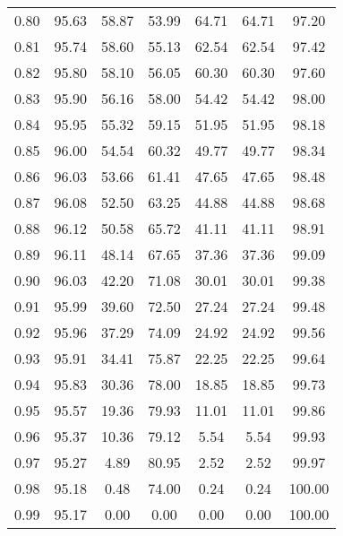 \begin{tabular}{|c|c|c|c|c|c|c|}
      0.80 &     95.63 &     58.87 &      53.99 &   64.71 &      64.71 &         97.20 \\
      0.81 &     95.74 &     58.60 &      55.13 &   62.54 &      62.54 &         97.42 \\
      0.82 &     95.80 &     58.10 &      56.05 &   60.30 &      60.30 &         97.60 \\
      0.83 &     95.90 &     56.16 &      58.00 &   54.42 &      54.42 &         98.00 \\
      0.84 &     95.95 &     55.32 &      59.15 &   51.95 &      51.95 &         98.18 \\
      0.85 &     96.00 &     54.54 &      60.32 &   49.77 &      49.77 &         98.34 \\
      0.86 &     96.03 &     53.66 &      61.41 &   47.65 &      47.65 &         98.48 \\
      0.87 &     96.08 &     52.50 &      63.25 &   44.88 &      44.88 &         98.68 \\
      0.88 &     96.12 &     50.58 &      65.72 &   41.11 &      41.11 &         98.91 \\
      0.89 &     96.11 &     48.14 &      67.65 &   37.36 &      37.36 &         99.09 \\
      0.90 &     96.03 &     42.20 &      71.08 &   30.01 &      30.01 &         99.38 \\
      0.91 &     95.99 &     39.60 &      72.50 &   27.24 &      27.24 &         99.48 \\
      0.92 &     95.96 &     37.29 &      74.09 &   24.92 &      24.92 &         99.56 \\
      0.93 &     95.91 &     34.41 &      75.87 &   22.25 &      22.25 &         99.64 \\
      0.94 &     95.83 &     30.36 &      78.00 &   18.85 &      18.85 &         99.73 \\
      0.95 &     95.57 &     19.36 &      79.93 &   11.01 &      11.01 &         99.86 \\
      0.96 &     95.37 &     10.36 &      79.12 &    5.54 &       5.54 &         99.93 \\
      0.97 &     95.27 &      4.89 &      80.95 &    2.52 &       2.52 &         99.97 \\
      0.98 &     95.18 &      0.48 &      74.00 &    0.24 &       0.24 &        100.00 \\
      0.99 &     95.17 &      0.00 &       0.00 &    0.00 &       0.00 &        100.00 \\
\bottomrule
\end{tabular}
